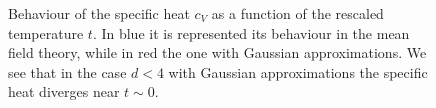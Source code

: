 \documentclass[../main/main.tex]{subfiles}
\begin{document}
\begin{figure}[h!]
\begin{minipage}[c]{0.5\linewidth}
\end{minipage}
\begin{minipage}[]{0.5\linewidth}
\centering
{}
\end{minipage}
\caption{\label{fig:} Behaviour of the specific heat \( c_V \) as a function of the rescaled temperature \( t \). In blue it is represented its behaviour in the mean field theory, while in red the one with Gaussian approximations. We see that in the case \( d<4 \) with Gaussian approximations the specific heat diverges near \( t \sim 0 \). }
\end{figure}
\end{document}
